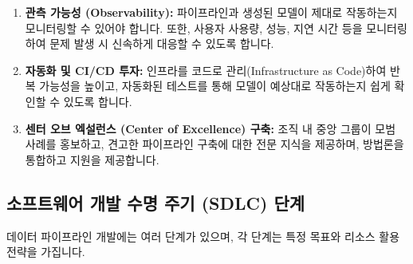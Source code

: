 \documentclass[11pt,a4paper]{article}
\theoremstyle{definition}
\begin{document}
\begin{enumerate}
    \item \textbf{관측 가능성 (Observability):}
    파이프라인과 생성된 모델이 제대로 작동하는지 모니터링할 수 있어야 합니다. 또한, 사용자 사용량, 성능, 지연 시간 등을 모니터링하여 문제 발생 시 신속하게 대응할 수 있도록 합니다.

    \item \textbf{자동화 및 CI/CD 투자:}
    인프라를 코드로 관리(Infrastructure as Code)하여 반복 가능성을 높이고, 자동화된 테스트를 통해 모델이 예상대로 작동하는지 쉽게 확인할 수 있도록 합니다.

    \item \textbf{센터 오브 엑설런스 (Center of Excellence) 구축:}
    조직 내 중앙 그룹이 모범 사례를 홍보하고, 견고한 파이프라인 구축에 대한 전문 지식을 제공하며, 방법론을 통합하고 지원을 제공합니다.
\end{enumerate}

\subsection{소프트웨어 개발 수명 주기 (SDLC) 단계}
데이터 파이프라인 개발에는 여러 단계가 있으며, 각 단계는 특정 목표와 리소스 활용 전략을 가집니다.
\end{document}
